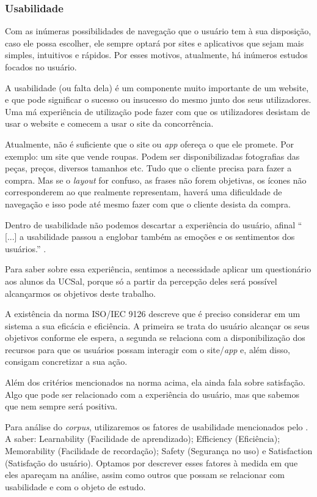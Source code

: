 \documentclass[12pt]{article}
\begin{document}
\subsubsection{Usabilidade}
Com as inúmeras possibilidades de navegação que o usuário tem à sua disposição, caso ele possa escolher, ele sempre optará por sites e aplicativos que sejam mais simples, intuitivos e rápidos. Por esses motivos, atualmente, há inúmeros estudos focados no usuário. 
\begin{quoting}[rightmargin=0cm,leftmargin=4cm]
{\footnotesize 
A usabilidade (ou falta dela) é um componente muito importante de um website, e que pode significar o sucesso ou insucesso do mesmo junto dos seus utilizadores. Uma má experiência de utilização pode fazer com que os utilizadores desistam de usar o website e comecem a usar o site da concorrência.  \cite{noauthor_introducao_usabilidade}}
\end{quoting}
Atualmente, não é suficiente que o site ou \textit{app} ofereça o que ele promete. Por exemplo: um site que vende roupas. Podem ser disponibilizadas fotografias das peças, preços, diversos tamanhos etc. Tudo que o cliente precisa para fazer a compra. Mas se o \textit{layout} for confuso, as frases não forem objetivas, os ícones não corresponderem ao que realmente representam, haverá uma dificuldade de navegação e isso pode até mesmo fazer com que o cliente desista da compra.  

Dentro de usabilidade não podemos descartar a experiência do usuário, afinal “ [...] a usabilidade passou a englobar também as emoções e os sentimentos dos usuários.” \cite[p. ~51]{barbosa}.

Para saber sobre essa experiência, sentimos a necessidade aplicar um questionário aos alunos da UCSal, porque só a partir da percepção deles será possível alcançarmos os objetivos deste trabalho.

A existência da norma ISO/IEC 9126 descreve que é preciso considerar em um sistema a sua eficácia e eficiência.  A primeira se trata do usuário alcançar os seus objetivos conforme ele espera, a segunda se relaciona com a disponibilização dos recursos para que os usuários possam interagir com o site/\textit{app} e, além disso, consigam concretizar a sua ação.

Além dos critérios mencionados na norma acima, ela ainda fala sobre satisfação. Algo que  pode ser relacionado com a experiência do usuário, mas que sabemos que nem sempre será positiva.

Para análise do \textit{corpus}, utilizaremos os fatores de usabilidade mencionados pelo . A saber: Learnability (Facilidade de aprendizado); Efficiency (Eficiência); Memorability (Facilidade de recordação); Safety (Segurança no uso) e Satisfaction (Satisfação do usuário). Optamos por descrever esses fatores à medida em que eles apareçam na análise, assim como outros que possam se relacionar com usabilidade e com o objeto de estudo.
\end{document}
